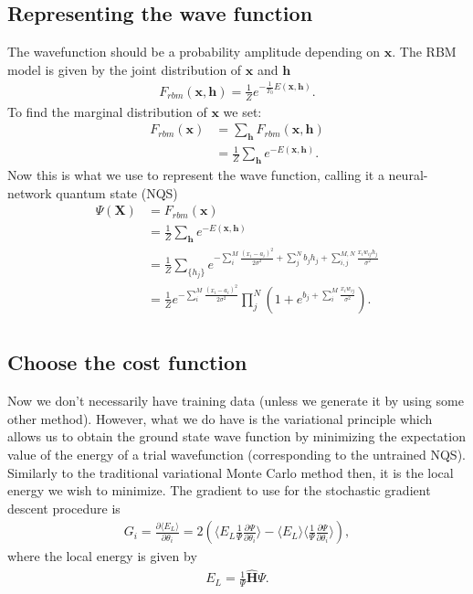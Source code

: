 \documentclass[aip,jcp,reprint,floatfix]{revtex4-1}
\begin{document}
\begin{itemize}
\subsection*{Representing the wave function}
The wavefunction should be a probability amplitude depending on $\bm{x}$. The RBM model is given by the joint distribution of $\bm{x}$ and $\bm{h}$
\begin{align}
	F_{rbm}(\mathbf{x},\mathbf{h}) = \frac{1}{Z} e^{-\frac{1}{T_0}E(\mathbf{x},\mathbf{h})}.
\end{align}
To find the marginal distribution of $\bm{x}$ we set:
\begin{align}
	F_{rbm}(\mathbf{x}) &= \sum_\mathbf{h} F_{rbm}(\mathbf{x}, \mathbf{h}) \\
				&= \frac{1}{Z}\sum_\mathbf{h} e^{-E(\mathbf{x}, \mathbf{h})}.
\end{align}
Now this is what we use to represent the wave function, calling it a neural-network quantum state (NQS)
\begin{align}
	\Psi (\mathbf{X}) &= F_{rbm}(\mathbf{x}) \\
	&= \frac{1}{Z}\sum_{\bm{h}} e^{-E(\mathbf{x}, \mathbf{h})} \\
	&= \frac{1}{Z} \sum_{\{h_j\}} e^{-\sum_i^M \frac{(x_i - a_i)^2}{2\sigma^2} + \sum_j^N b_j h_j + \sum_{i,j}^{M,N} \frac{x_i w_{ij} h_j}{\sigma^2}} \\
	&= \frac{1}{Z} e^{-\sum_i^M \frac{(x_i - a_i)^2}{2\sigma^2}} \prod_j^N (1 + e^{b_j + \sum_i^M \frac{x_i w_{ij}}{\sigma^2}}). \\
\end{align}

\subsection*{Choose the cost function}
Now we don't necessarily have training data (unless we generate it by using some other method). However, what we do have is the variational principle which allows us to obtain the ground state wave function by minimizing the expectation value of the energy of a trial wavefunction (corresponding to the untrained NQS). Similarly to the traditional variational Monte Carlo method then, it is the local energy we wish to minimize. The gradient to use for the stochastic gradient descent procedure is
\begin{align}
	G_i = \frac{\partial \langle E_L \rangle}{\partial \theta_i}
	= 2(\langle E_L \frac{1}{\Psi}\frac{\partial \Psi}{\partial \theta_i} \rangle - \langle E_L \rangle \langle \frac{1}{\Psi}\frac{\partial \Psi}{\partial \theta_i} \rangle ),
\end{align}
where the local energy is given by
\begin{align}
	E_L = \frac{1}{\Psi} \hat{\mathbf{H}} \Psi.
\end{align}




\end{itemize}
\end{document}
